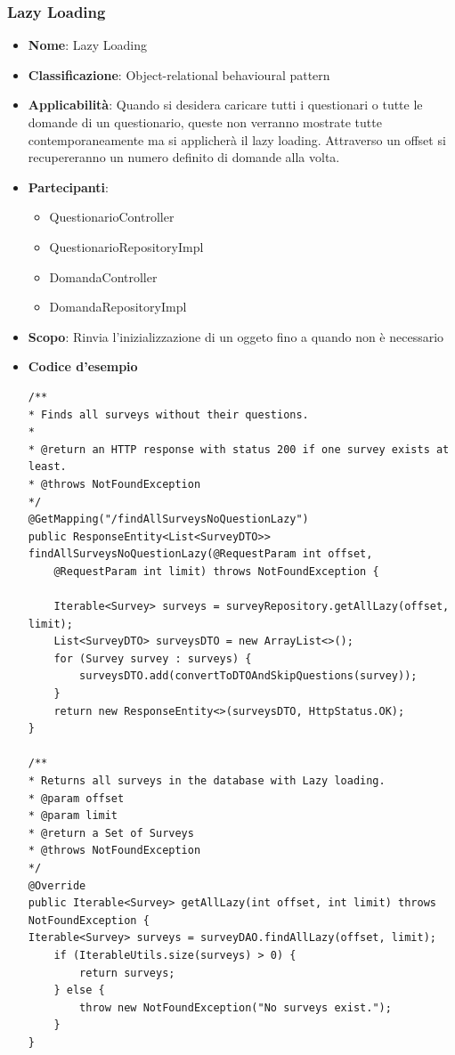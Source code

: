 \documentclass[12pt]{article}
\begin{document}
		\subsubsection{Lazy Loading}
		\begin{itemize}
            \item \textbf{Nome}: Lazy Loading
            \item \textbf{Classificazione}: Object-relational behavioural pattern
            \item \textbf{Applicabilità}: Quando si desidera caricare tutti i questionari o tutte le domande di un questionario, queste non verranno mostrate tutte contemporaneamente ma si applicherà il lazy loading. Attraverso un offset si recupereranno un numero definito di domande alla volta.
            \item \textbf{Partecipanti}:
                \begin{itemize}
                    \item QuestionarioController
                    \item QuestionarioRepositoryImpl
                    \item DomandaController
                    \item DomandaRepositoryImpl
                \end{itemize}
            \item \textbf{Scopo}: Rinvia l'inizializzazione di un oggeto fino a quando non è necessario
            \item \textbf{Codice d'esempio}
            \begin{lstlisting}
/**
* Finds all surveys without their questions.
* 
* @return an HTTP response with status 200 if one survey exists at least.
* @throws NotFoundException
*/
@GetMapping("/findAllSurveysNoQuestionLazy")
public ResponseEntity<List<SurveyDTO>> findAllSurveysNoQuestionLazy(@RequestParam int offset, 
	@RequestParam int limit) throws NotFoundException {

	Iterable<Survey> surveys = surveyRepository.getAllLazy(offset, limit);
	List<SurveyDTO> surveysDTO = new ArrayList<>();
	for (Survey survey : surveys) {
		surveysDTO.add(convertToDTOAndSkipQuestions(survey));
	}
	return new ResponseEntity<>(surveysDTO, HttpStatus.OK);
}

/**
* Returns all surveys in the database with Lazy loading.
* @param offset
* @param limit
* @return a Set of Surveys
* @throws NotFoundException
*/
@Override
public Iterable<Survey> getAllLazy(int offset, int limit) throws NotFoundException {
Iterable<Survey> surveys = surveyDAO.findAllLazy(offset, limit);
	if (IterableUtils.size(surveys) > 0) {
		return surveys;
	} else {
		throw new NotFoundException("No surveys exist.");
	}
}
            \end{lstlisting}
        \end{itemize}
\end{document}
